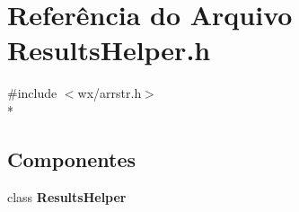 \section{Referência do Arquivo Results\+Helper.\+h}
\label{_results_helper_8h}
{\ttfamily \#include $<$wx/arrstr.\+h$>$}\\*
\subsection*{Componentes}
\begin{DoxyCompactItemize}
\item 
class {\bf Results\+Helper}
\end{DoxyCompactItemize}
